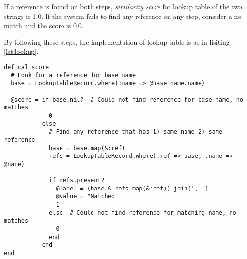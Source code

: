 If a reference is found on both steps, \emph{similarity score} for lookup table
of the two strings is 1.0. If the system fails to find any reference on
any step, consider a no match and the score is 0.0.

By following these steps, the implementation of lookup table
is as in lisiting \ref{lst:lookup}.

\begin{minipage}{\linewidth}
\begin{lstlisting}[label={lst:lookup}, caption={Lookup table implementation.}]
def cal_score
  # Look for a reference for base name
  base = LookupTableRecord.where(:name => @base_name.name)

  @score = if base.nil?  # Could not find reference for base name, no matches
             0
           else
             # Find any reference that has 1) same name 2) same reference
             base = base.map(&:ref)
             refs = LookupTableRecord.where(:ref => base, :name => @name)

             if refs.present?
               @label = (base & refs.map(&:ref)).join(', ')
               @value = "Matched"
               1
             else  # Could not find reference for matching name, no matches
               0
             end
           end
end
\end{lstlisting}
\end{minipage}
